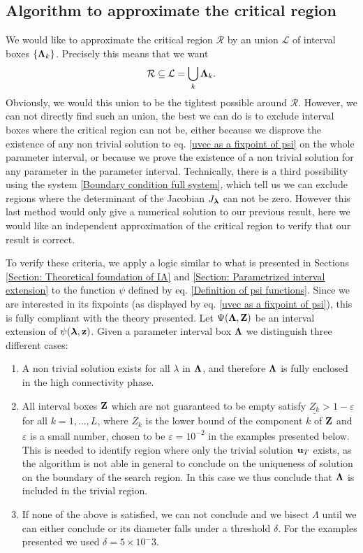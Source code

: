 \documentclass[
11pt, %
american, %
singlespacing, %
final, %
nolistspacing, %
liststotoc, %
headsepline, %
]{MastersDoctoralThesis} %
\begin{document}
\subsection{Algorithm to approximate the critical region}

We would like to approximate the critical region $\mathcal{R}$ by an union $\mathcal{L}$ of interval boxes $\{\boldsymbol{\mathrm{\Lambda}}_k\}$. Precisely this means that we want
\begin{align}
	\mathcal{R} \subseteq \mathcal{L} = \bigcup_k \boldsymbol{\mathrm{\Lambda}}_k.
\end{align}	
Obviously, we would this union to be the tightest possible around $\mathcal{R}$. However, we can not directly find such an union, the best we can do is to exclude interval boxes where the critical region can not be, either because we disprove the existence of any non trivial solution to eq. \eqref{uvec as a fixpoint of psi} on the whole parameter interval, or because we prove the existence of a non trivial solution for any parameter in the parameter interval. Technically, there is a third possibility using the system \eqref{Boundary condition full system}, which tell us we can exclude regions where the determinant of the Jacobian $J_{\boldsymbol{\mathrm{\lambda}}}$ can not be zero. However this last method would only give a numerical solution to our previous result, here we would like an independent approximation of the critical region to verify that  our result is correct.

To verify these criteria, we apply a logic similar to what is presented in Sections \ref{Section: Theoretical foundation of IA} and \ref{Section: Parametrized interval extension} to the function $\psi$ defined by eq. \eqref{Definition of psi functions}. Since we are interested in its fixpoints (as displayed by eq. \eqref{uvec as a fixpoint of psi}), this is fully compliant with the theory presented. Let $\Psi(\boldsymbol{\mathrm{\Lambda}}, \boldsymbol{\mathrm{Z}})$ be an interval extension of $\psi(\boldsymbol{\mathrm{\lambda}}, \boldsymbol{\mathrm{z}})$. Given a parameter interval box $\boldsymbol{\mathrm{\Lambda}}$ we distinguish three different cases:
\begin{enumerate}
	\item A non trivial solution exists for all $\lambda$ in $\boldsymbol{\mathrm{\Lambda}}$, and therefore $\boldsymbol{\mathrm{\Lambda}}$ is fully enclosed in the high connectivity phase.
	\item All interval boxes $\boldsymbol{\mathrm{Z}}$ which are not guaranteed to be empty satisfy $\underline{Z_k} > 1 - \varepsilon$ for all $k = 1, \dots, L$, where $\underline{Z_k}$ is the lower bound of the component $k$ of $\boldsymbol{\mathrm{Z}}$ and $\varepsilon$ is a small number, chosen to be $\varepsilon = 10^{-2}$ in the examples presented below. This is needed to identify region where only the trivial solution $\boldsymbol{\mathrm{u}}_T$ exists, as the algorithm is not able in general to conclude on the uniqueness of solution on the boundary of the search region. In this case we thus conclude that $\boldsymbol{\mathrm{\Lambda}}$ is included in the trivial region.
	\item If none of the above is satisfied, we can not conclude and we bisect $\Lambda$ until we can either conclude or its diameter falls under a threshold $\delta$. For the examples presented we used $\delta = 5 \times 10^-3$.
\end{enumerate}
\end{document}
